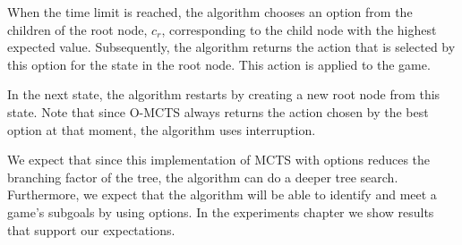 When the time limit is reached, the algorithm chooses an option from the
children of the root node, $c_r$, corresponding to the child node with the
highest expected value. Subsequently, the algorithm returns the action that is
selected by this option for the state in the root node. This action is applied
to the game.

In the next state, the algorithm restarts by creating a new root node from
this state. Note that since O-MCTS always returns the action chosen by the best
option at that moment, the algorithm uses interruption.

We expect that since this implementation of MCTS with options reduces the
branching factor of the tree, the algorithm can do a deeper tree search.
Furthermore, we expect that the algorithm will be able to
identify and meet a game's subgoals by using options. In the experiments chapter we show results
that support our expectations.
